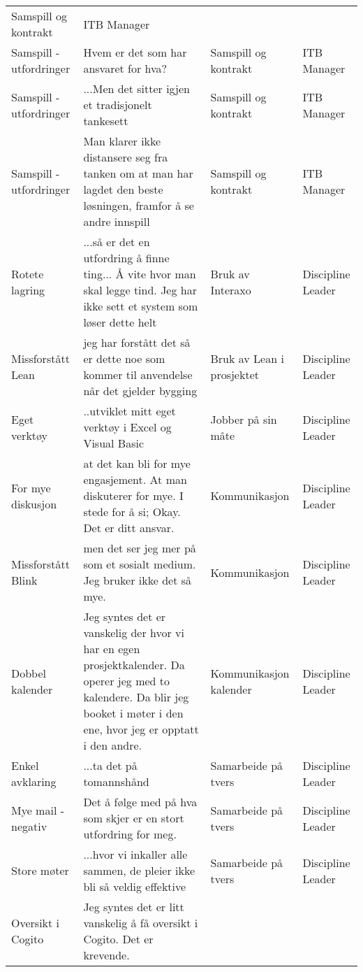 \begin{landscape}
\begin{longtable}{p{0.25\textheight}p{0.5\textheight}p{0.25\textheight}p{0.25\textheight}}
      Samspill og kontrakt &
      ITB Manager \\
    Samspill - utfordringer &
      Hvem er det som har ansvaret for hva? &
      Samspill og kontrakt &
      ITB Manager \\
    Samspill - utfordringer &
      ...Men det sitter igjen et tradisjonelt tankesett &
      Samspill og kontrakt &
      ITB Manager \\
    Samspill - utfordringer &
      Man klarer ikke distansere seg fra tanken om at man har lagdet den beste løsningen, framfor å se andre innspill &
      Samspill og kontrakt &
      ITB Manager \\
    Rotete lagring &
      ...så er det en utfordring å finne ting... Å vite hvor man skal legge tind. Jeg har ikke sett et system som løser dette helt &
      Bruk av Interaxo &
      Discipline Leader \\
    Missforstått Lean &
      jeg har forstått det så er dette noe som kommer til anvendelse når det gjelder bygging &
      Bruk av Lean i prosjektet &
      Discipline Leader \\
    Eget verktøy &
      ..utviklet mitt eget verktøy i Excel og Visual Basic &
      Jobber på sin måte &
      Discipline Leader \\
    For mye diskusjon &
      at det kan bli for mye engasjement. At man diskuterer for mye. I stede for å si; Okay. Det er ditt ansvar. &
      Kommunikasjon &
      Discipline Leader \\
    Missforstått Blink &
      men det ser jeg mer på som et sosialt medium. Jeg bruker ikke det så mye. &
      Kommunikasjon &
      Discipline Leader \\
    Dobbel kalender &
      Jeg syntes det er vanskelig der hvor vi har en egen prosjektkalender. Da operer jeg med to kalendere. Da blir jeg booket i møter i den ene, hvor jeg er opptatt i den andre. &
      Kommunikasjon kalender &
      Discipline Leader \\
    Enkel avklaring &
      ...ta det på tomannshånd &
      Samarbeide på tvers &
      Discipline Leader \\
    Mye mail - negativ &
      Det å følge med på hva som skjer er en stort utfordring for meg. &
      Samarbeide på tvers &
      Discipline Leader \\
    Store møter &
      ...hvor vi inkaller alle sammen, de pleier ikke bli så veldig effektive &
      Samarbeide på tvers &
      Discipline Leader \\
    Oversikt i Cogito &
      Jeg syntes det er litt vanskelig å få oversikt i Cogito. Det er krevende. &

\end{longtable}
\end{landscape}
